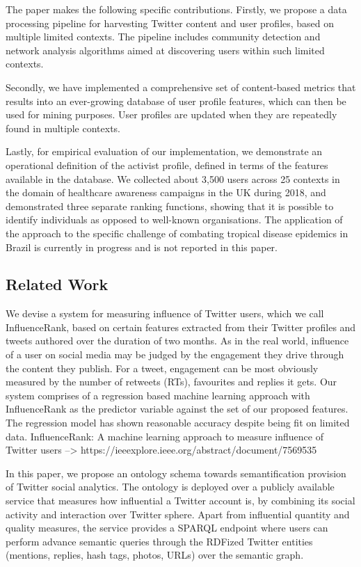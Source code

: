 The paper makes the following specific contributions.
%
Firstly, we propose a data processing pipeline for harvesting Twitter content and user profiles, based on multiple limited contexts. 
The pipeline includes community detection and network analysis algorithms aimed at discovering users within such limited contexts.

Secondly, we have implemented a comprehensive set of content-based metrics that results into an ever-growing database of user profile features, which can then be used for mining purposes. 
User profiles are updated when they are repeatedly found in multiple contexts.

Lastly, for empirical evaluation of our implementation, we demonstrate an operational definition of the activist profile, defined in terms of the features available in the database. We collected about 3,500 users  across 25 contexts in the domain of healthcare awareness campaigns in the UK during 2018, and demonstrated three separate ranking functions, showing that it is possible to identify individuals as opposed to well-known organisations.
The application of the approach to the specific challenge of combating tropical disease epidemics in Brazil is currently in progress and is not reported in this paper.

\subsection{Related Work}  \label{sec:related}



We devise a system for measuring influence of Twitter users, which we call InfluenceRank, based on certain features extracted from their Twitter profiles and tweets authored over the duration of two months. As in the real world, influence of a user on social media may be judged by the engagement they drive through the content they publish. For a tweet, engagement can be most obviously measured by the number of retweets (RTs), favourites and replies it gets. Our system comprises of a regression based machine learning approach with InfluenceRank as the predictor variable against the set of our proposed features. The regression model has shown reasonable accuracy despite being fit on limited data.
\cite{7569535}   {InfluenceRank: A machine learning approach to measure influence of Twitter users --> https://ieeexplore.ieee.org/abstract/document/7569535} 

In this paper, we propose an ontology schema towards semantification provision of Twitter social analytics. The ontology is deployed over a publicly available service that measures how influential a Twitter account is, by combining its social activity and interaction over Twitter sphere. Apart from influential quantity and quality measures, the service provides a SPARQL endpoint where users can perform advance semantic queries through the RDFized Twitter entities (mentions, replies, hash tags, photos, URLs) over the semantic graph.
\cite{6978961}

